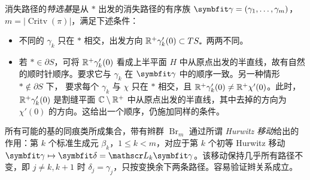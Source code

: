 消失路径的\emph{特选基}是从 $*$ 出发的消失路径的有序族 $\symbfit\gamma=(\gamma_1,\ldots,\gamma_m)$，$m=|\operatorname{Critv}(\pi)|$，满足下述条件：
\begin{itemize}
\item 不同的 $\gamma_k$ 只在 $*$ 相交，出发方向 $\mathbb R^+\gamma_k'(0)\subset TS_*$ 两两不同。
\item 若 $*\in\partial S$，可将 $\mathbb R^+\gamma_k'(0)$ 看成上半平面 $H$ 中从原点出发的半直线，故有自然的顺时针顺序。要求它与 $\gamma_k$ 在 $\symbfit\gamma$ 中的顺序一致。另一种情形 $*\notin\partial S$ 下，
要求每个 $\gamma_k$ 与 $\chi$ 只在 $*$ 相交，且 $\mathbb R^+\gamma_k'(0)\ne\mathbb R^+\chi'(0)$。此时，$\mathbb R^+\gamma_k'(0)$ 是割缝平面 $\mathbb C\setminus\mathbb R^+$ 中从原点出发的半直线，其中去掉的方向为 $\chi'(0)$ 的方向。这给出一个顺序，仍施加同样的条件。
\end{itemize}
所有可能的基的同痕类所成集合，带有辫群 $\operatorname{Br}_m$ 通过所谓 \emph{Hurwitz 移动}给出的作用：第 $k$ 个标准生成元 $\beta_k$，$1\leq k<m$，对应于第 $k$ 个初等 Hurwitz 移动 $\symbfit\gamma\mapsto\symbfit\delta=\mathscr L_k\symbfit\gamma$。该移动保持几乎所有路径不变，即 $j\ne k,k+1$ 时 $\delta_j=\gamma_j$，只按变换余下两条路径。容易验证辫关系成立。

